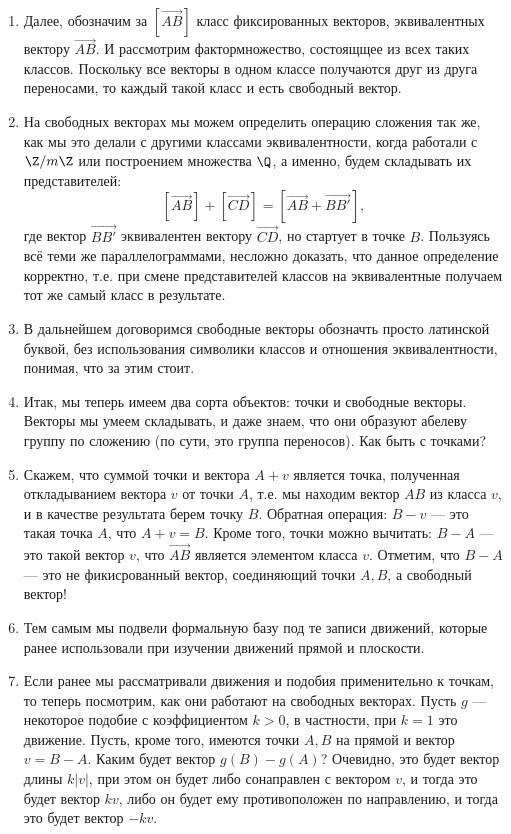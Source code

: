 \begin{enumerate}
\item Далее, обозначим за $[\vec{AB}]$ класс фиксированных векторов, эквивалентных вектору $\vec{AB}$. И рассмотрим фактормножество, состоящщее из всех таких классов. Поскольку все векторы в одном классе получаются друг из друга переносами, то каждый такой класс и есть свободный вектор.
\item На свободных векторах мы можем определить операцию сложения так же, как мы это делали с другими классами эквивалентности, когда работали с $\Z/m\Z$ или построением множества $\Q$, а именно, будем складывать их представителей:
$$
[\vec{AB}] + [\vec{CD}] = [\vec{AB}+\vec{BB'}],
$$
где вектор $\vec{BB'}$ эквивалентен вектору $\vec{CD}$, но стартует в точке $B$. Пользуясь всё теми же параллелограммами, несложно доказать, что данное определение корректно, т.е. при смене представителей классов на эквивалентные получаем тот же самый класс в результате. 
\item В дальнейшем договоримся свободные векторы обозначть просто латинской буквой, без использования символики классов и отношения эквивалентности, понимая, что за этим стоит.
\item Итак, мы теперь имеем два сорта объектов: точки и свободные векторы. Векторы мы умеем складывать, и даже знаем, что они образуют абелеву группу по сложению (по сути, это группа переносов). Как быть с точками?
\item Скажем, что суммой точки и вектора $A+v$ является точка, полученная откладыванием вектора $v$ от точки $A$, т.е. мы находим вектор $AB$ из класса $v$, и в качестве результата берем точку $B$. Обратная операция: $B-v$ --- это такая точка $A$, что $A+v=B$. Кроме того, точки можно вычитать: $B-A$ --- это такой вектор $v$, что $\vec{AB}$ является элементом класса $v$. Отметим, что $B-A$ --- это не фикисрованный вектор, соединяющий точки $A,B$, а свободный вектор!
\item Тем самым мы подвели формальную базу под те записи движений, которые ранее использовали при изучении движений прямой и плоскости.



\item Если ранее мы рассматривали движения и подобия применительно к точкам, то теперь посмотрим, как они работают на свободных векторах. Пусть $g$ --- некоторое подобие с коэффициентом $k>0$, в частности, при $k=1$ это движение.
Пусть, кроме того, имеются точки $A,B$ на прямой и вектор $v=B-A$. Каким будет вектор $g(B)-g(A)$? Очевидно, это будет вектор длины $k|v|$, при этом он будет либо сонаправлен с вектором $v$, и тогда это будет вектор $kv$, либо он будет ему противоположен по направлению, и тогда это будет вектор $-kv$.


\end{enumerate}
